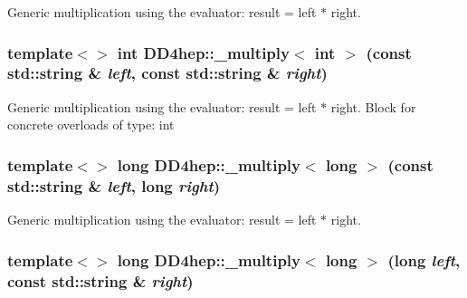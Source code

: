 Generic multiplication using the evaluator: result = left $\ast$ right. \hypertarget{group___d_d4_h_e_p___g_e_o_m_e_t_r_y_gaa8e3a445b4796f599909c845e7a3e68e}{
\subsubsection[{\_\-multiply$<$ int $>$}]{\setlength{\rightskip}{0pt plus 5cm}template$<$$>$ int DD4hep::\_\-multiply$<$ int $>$ (const std::string \& {\em left}, \/  const std::string \& {\em right})}}
\label{group___d_d4_h_e_p___g_e_o_m_e_t_r_y_gaa8e3a445b4796f599909c845e7a3e68e}


Generic multiplication using the evaluator: result = left $\ast$ right. Block for concrete overloads of type: int \hypertarget{group___d_d4_h_e_p___g_e_o_m_e_t_r_y_ga74e3bcc56a765455b68311b0113f10ec}{
\subsubsection[{\_\-multiply$<$ long $>$}]{\setlength{\rightskip}{0pt plus 5cm}template$<$$>$ long DD4hep::\_\-multiply$<$ long $>$ (const std::string \& {\em left}, \/  long {\em right})}}
\label{group___d_d4_h_e_p___g_e_o_m_e_t_r_y_ga74e3bcc56a765455b68311b0113f10ec}


Generic multiplication using the evaluator: result = left $\ast$ right. \hypertarget{group___d_d4_h_e_p___g_e_o_m_e_t_r_y_ga0536df8e24d4ddb71df72fcbcfab09f0}{
\subsubsection[{\_\-multiply$<$ long $>$}]{\setlength{\rightskip}{0pt plus 5cm}template$<$$>$ long DD4hep::\_\-multiply$<$ long $>$ (long {\em left}, \/  const std::string \& {\em right})}}
\label{group___d_d4_h_e_p___g_e_o_m_e_t_r_y_ga0536df8e24d4ddb71df72fcbcfab09f0}


